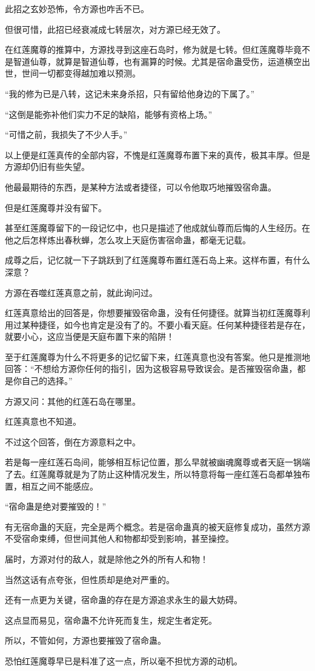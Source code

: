 \begin{this_body}
此招之玄妙恐怖，令方源也咋舌不已。

但很可惜，此招已经衰减成七转层次，对方源已经无效了。

在红莲魔尊的推算中，方源找寻到这座石岛时，修为就是七转。但红莲魔尊毕竟不是智道仙尊，就算是智道仙尊，也有漏算的时候。尤其是宿命蛊受伤，运道横空出世，世间一切都变得越加难以预测。

“我的修为已是八转，这记未来身杀招，只有留给他身边的下属了。”

“这倒是能弥补他们实力不足的缺陷，能够有资格上场。”

“可惜之前，我损失了不少人手。”

以上便是红莲真传的全部内容，不愧是红莲魔尊布置下来的真传，极其丰厚。但是方源却仍旧有些失望。

他最最期待的东西，是某种方法或者捷径，可以令他取巧地摧毁宿命蛊。

但是红莲魔尊并没有留下。

甚至红莲魔尊留下的一段记忆中，也只是描述了他成就仙尊而后悔的人生经历。在他之后怎样炼出春秋蝉，怎么攻上天庭伤害宿命蛊，都毫无记载。

成尊之后，记忆就一下子跳跃到了红莲魔尊布置红莲石岛上来。这样布置，有什么深意？

方源在吞噬红莲真意之前，就此询问过。

红莲真意给出的回答是，你想要摧毁宿命蛊，没有任何捷径。就算当初红莲魔尊利用过某种捷径，如今也肯定是没有了的。不要小看天庭。任何某种捷径若是存在，就要小心，这应当便是天庭布置下来的陷阱！

至于红莲魔尊为什么不将更多的记忆留下来，红莲真意也没有答案。他只是推测地回答：“不想给方源你任何的指引，因为这极容易导致误会。是否摧毁宿命蛊，都是你自己的选择。”

方源又问：其他的红莲石岛在哪里。

红莲真意也不知道。

不过这个回答，倒在方源意料之中。

若是每一座红莲石岛间，能够相互标记位置，那么早就被幽魂魔尊或者天庭一锅端了去。红莲魔尊就是为了防止这种情况发生，所以特意将每一座红莲石岛都单独布置，相互之间不能感应。

“宿命蛊是绝对要摧毁的！”

有无宿命蛊的天庭，完全是两个概念。若是宿命蛊真的被天庭修复成功，虽然方源不受宿命束缚，但世间其他人和物都却受到影响，甚至操控。

届时，方源对付的敌人，就是除他之外的所有人和物！

当然这话有点夸张，但性质却是绝对严重的。

还有一点更为关键，宿命蛊的存在是方源追求永生的最大妨碍。

这点显而易见，宿命蛊不允许死而复生，规定生者定死。

所以，不管如何，方源也要摧毁了宿命蛊。

恐怕红莲魔尊早已是料准了这一点，所以毫不担忧方源的动机。

\end{this_body}

